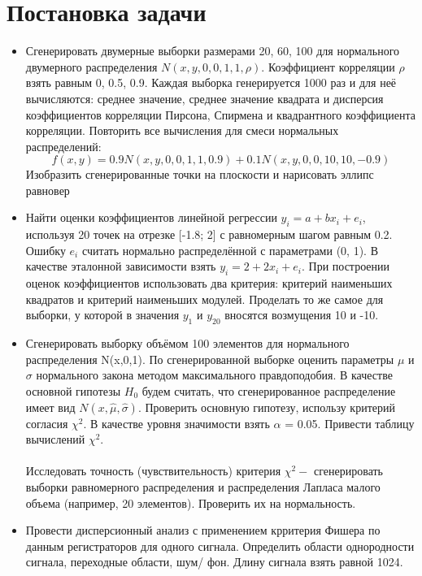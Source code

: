 \documentclass[a4paper]{article}
\begin{document}
    
    \tableofcontents
    \newpage
	\listoffigures
    \newpage
	\listoftables
    \newpage

\section {Постановка задачи}
    \begin{itemize}
        \item  Сгенерировать двумерные выборки размерами 20, 60, 100 для нормального двумерного распределения $N(x,y,0,0,1,1,\rho)$. Коэффициент корреляции $\rho$ взять равным 0, 0.5, 0.9. Каждая выборка генерируется 1000 раз и для неё вычисляются: среднее значение, среднее значение квадрата и дисперсия коэффициентов корреляции Пирсона, Спирмена и квадрантного коэффициента корреляции. Повторить все вычисления для смеси нормальных распределений:
               \begin{equation}
                   f(x,y) = 0.9N(x,y,0,0,1,1,0.9) + 0.1N(x,y,0,0,10,10,-0.9)
               \end{equation}
        \noindent Изобразить сгенерированные точки на плоскости и нарисовать эллипс равновер
        \item Найти оценки коэффициентов линейной регрессии $y_{i} = a + bx_{i} + e_{i}$, используя 20 точек на отрезке [-1.8; 2] с равномерным шагом равным 0.2. Ошибку $e_{i}$ считать нормально распределённой с параметрами (0, 1). В качестве эталонной зависимости взять $y_{i} = 2 + 2x_{i} + e_{i}$. При построении оценок коэффициентов использовать два критерия: критерий наименьших квадратов и критерий наименьших модулей. Проделать то же самое для выборки, у которой в значения $y_{1}$ и $y_{20}$ вносятся возмущения 10 и -10.

        \item   Сгенерировать выборку объёмом 100 элементов для нормального распределения N(x,0,1). По сгенерированной выборке оценить параметры $\mu$ и $\sigma$ нормального закона методом максимального правдоподобия. В качестве основной гипотезы $H_{0}$ будем считать, что сгенерированное распределение имеет вид $N(x,\hat{\mu}, \hat{\sigma})$. Проверить основную гипотезу, использу критерий согласия $\chi^{2}$. В качестве уровня значимости взять $\alpha$ = 0.05. Привести таблицу вычислений $\chi^{2}$.
                \\\\
                Исследовать точность (чувствительность) критерия $\chi^{2} - $ сгенерировать выборки равномерного распределения и распределения Лапласа малого объема (например, 20 элементов). Проверить их на нормальность.

        \item Провести дисперсионный анализ с применением крритерия Фишера по данным регистраторов для одного сигнала.
              Определить области однородности сигнала, переходные области, шум/ фон.
              Длину сигнала взять равной 1024.
    \end{itemize}
\end{document}

